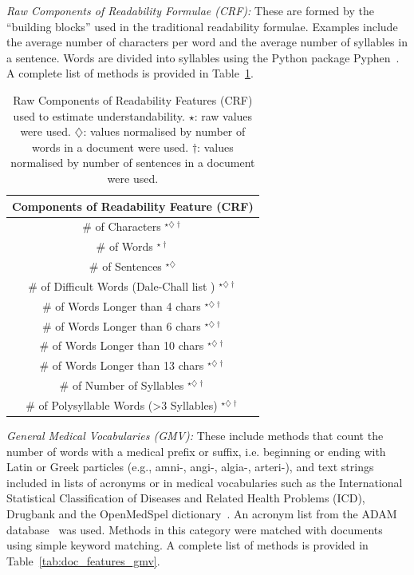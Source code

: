 \documentclass[10pt,a4paper]{article}
\begin{document}
\textit{Raw Components of Readability Formulae (CRF):}
These are formed by the ``building blocks'' used in the traditional readability formulae. Examples include the average number of characters per word and the average number of syllables in a sentence. Words are divided into syllables using the Python package Pyphen~\cite{pyphen}. A complete list of methods is provided in Table~\ref{tab:doc_features_crf}.

\begin{table}[t]
	\caption{Raw Components of Readability Features (CRF) used to estimate understandability.
		$\star$: raw values were used. $\diamondsuit$: values normalised
		by number of words in a document were used. $\dagger$: values normalised
		by number of sentences in a document were used.}
	\label{tab:doc_features_crf} \vspace{-10pt}
	\begin{tabular}{c}
		\toprule 
		\textbf{Components of Readability Feature (CRF)}\tabularnewline
		\midrule 
		\# of Characters $^{\star\diamondsuit\dagger}$ \tabularnewline
		\# of Words $^{\star\dagger}$ \tabularnewline
		\# of Sentences {$^{\star\diamondsuit}$} \tabularnewline
		\# of Difficult Words (Dale-Chall list \cite{dale48}) $^{\star\diamondsuit\dagger}$ \tabularnewline
		\# of Words Longer than 4 chars $^{\star\diamondsuit\dagger}$ \tabularnewline
		\# of Words Longer than 6 chars $^{\star\diamondsuit\dagger}$ \tabularnewline
		\# of Words Longer than 10 chars $^{\star\diamondsuit\dagger}$ \tabularnewline
		\# of Words Longer than 13 chars $^{\star\diamondsuit\dagger}$ \tabularnewline
		\# of Number of Syllables $^{\star\diamondsuit\dagger}$ \tabularnewline
		\# of Polysyllable Words (\textgreater{}3 Syllables) $^{\star\diamondsuit\dagger}$ \tabularnewline
		\bottomrule
	\end{tabular}
\end{table}

\textit{General Medical Vocabularies (GMV):}
These include methods that count the number of words with a medical prefix or suffix, i.e. beginning or ending with Latin or Greek particles (e.g., amni-, angi-, algia-, arteri-), and text strings included in lists of acronyms or in medical vocabularies such as the International Statistical Classification of Diseases and Related Health Problems (ICD), Drugbank and the OpenMedSpel dictionary~\cite{openmedspel}. An acronym list from the ADAM database~\cite{zhou2006} was used. Methods in this category were matched with documents using simple keyword matching. A complete list of methods is provided in Table~\ref{tab:doc_features_gmv}.
\end{document}
